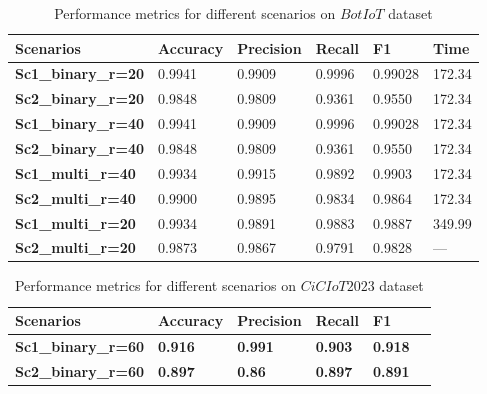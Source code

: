 \documentclass[journal,twoside,web]{ieeecolor}
\begin{document}
\begin{table}[h]
\caption{Performance metrics for different scenarios on $BotIoT$ dataset} %
\begin{center}
\begin{tabular}{ |p{2cm}|p{1cm}| p{1cm}| p{0.6cm}| p{0.8cm}| p{0.6cm}|}
 \hline
 \textbf{Scenarios} & \textbf{Accuracy}&\textbf{Precision} &\textbf{Recall}&\textbf{F1}&\textbf{Time}\\
 \hline
  
      \textbf{Sc1\_binary\_r=20} & 0.9941&0.9909&0.9996&0.99028&172.34 \\
       \hline
          \textbf{Sc2\_binary\_r=20} & 0.9848&0.9809&0.9361&0.9550&172.34 \\
       \hline
        \textbf{Sc1\_binary\_r=40} & 0.9941&0.9909&0.9996&0.99028&172.34 \\
       \hline
          \textbf{Sc2\_binary\_r=40} & 0.9848&0.9809&0.9361&0.9550&172.34 \\
       \hline
       \textbf{Sc1\_multi\_r=40} & 0.9934&0.9915&0.9892&0.9903&172.34 \\
       \hline
       \textbf{Sc2\_multi\_r=40} & 0.9900&0.9895&0.9834&0.9864&172.34 \\
       \hline
       \textbf{Sc1\_multi\_r=20} & 0.9934 &0.9891&0.9883&0.9887&349.99 \\
        \hline
        \textbf{Sc2\_multi\_r=20} & 0.9873&0.9867&0.9791&0.9828&--- \\
       
     
\hline
\end{tabular}
\end{center}
\end{table}

\begin{table}[h]
\caption{Performance metrics for different scenarios on $CiCIoT2023$ dataset} %
\begin{center}
\begin{tabular}{ |p{2cm}|p{1cm}| p{1cm}| p{0.6cm}| p{0.8cm}| p{0.6cm}|}
 \hline
 \textbf{Scenarios} & \textbf{Accuracy}&\textbf{Precision} &\textbf{Recall}&\textbf{F1}\\
 \hline
           \textbf{Sc1\_binary\_r=60} & \textbf{0.916}&\textbf{0.991}&\textbf{0.903}&\textbf{0.918} \\
   
       
       \hline
       \textbf{Sc2\_binary\_r=60} & \textbf{0.897}&\textbf{0.86}&\textbf{0.897}&\textbf{0.891} \\
\hline
\end{tabular}
\end{center}
\end{table}
\end{document}
